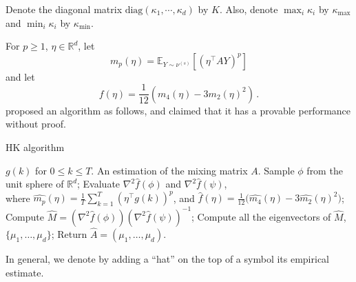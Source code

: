 \documentclass[twoside]{article}
\newcommand{\E}{\mathbb{E}}
\newcommand{\real}{\mathbb{R}}
\theoremstyle{definition}
\begin{document}
Denote the diagonal matrix $\text{diag}(\kappa_1,\cdots,\kappa_d)$ by $K$. 
Also, denote $\max_{i} \kappa_i$ by $\kappa_{\max}$ and $\min_{i} \kappa_i$ by $\kappa_{\min}$.

For $p\ge 1$, $\eta\in \real^d$, 
let 
\begin{equation}
\label{eq:mpdef}
m_p(\eta) = \E_{Y\sim \nu^{(s)}}[ (\eta^\top A Y)^p ]
\end{equation}
 and let
\begin{equation}\label{eq:fdef}
f(\eta) = \frac1{12} \left( m_4(\eta) - 3 m_2(\eta)^2 \right)\,.
\end{equation}
\citet{DHsu2012} proposed an algorithm as follows, and claimed that it has a provable performance without proof. 
\begin{algorithm}[H]
\caption{HK algorithm}
\begin{algorithmic}[1]
\INPUT $g(k)$ for $0\le k \le T$. 
\OUTPUT An estimation of the mixing matrix $A$. 
\STATE Sample $\phi$ from the unit sphere of $\real^d$;
\STATE Evaluate $\nabla^2\widehat{f}(\phi)$ and $\nabla^2\widehat{f}(\psi)$, \\
\quad where $\widehat{m_p}(\eta) = \frac{1}{T}\sum_{k=1}^{T} (\eta^{\top}g(k))^p$, and $\widehat{f}(\eta) = \frac{1}{12}\big(\widehat{m_4}(\eta) - 3\widehat{m_2}(\eta)^2 \big)$;
\STATE Compute $\widehat{M} = (\nabla^2 \widehat{f}(\phi))(\nabla^2\widehat{f}(\psi))^{-1}$;
\STATE Compute all the eigenvectors of $\widehat{M}$, $\{\mu_1,\ldots,\mu_d\}$;
\STATE Return $\widehat{A} = (\mu_1,\ldots,\mu_d)$.
\end{algorithmic}
\end{algorithm}
In general, we denote by adding a ``hat'' on the top of a symbol its empirical estimate.
\end{document}
